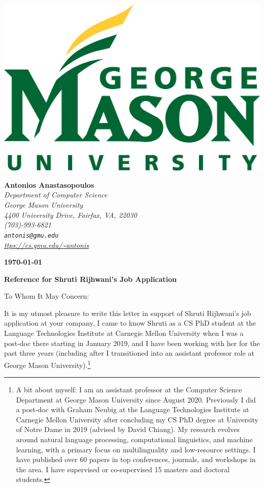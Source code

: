 \documentclass[10pt]{letter}
\begin{document}
\includegraphics[scale=1]{gmu.png}
\vspace{-3cm}

\begin{flushright}
\textbf{Antonios Anastasopoulos}\\
\textit{Department of Computer Science\\
George Mason University\\
4400 University Drive, Fairfax, VA, 22030\\
(703)-993-6821\\
\texttt{antonis@gmu.edu}\\
\url{ttps://cs.gmu.edu/~antonis}
}

\textbf{\today}
\end{flushright}
\vspace{0.2cm}

\textbf{Reference for Shruti Rijhwani's Job Application}

To Whom It May Concern:

It is my utmost pleasure to write this letter in support of Shruti Rijhwani's job application at your company.
I came to know Shruti as a CS PhD student at the Language Technologies Institute at Carnegie Mellon University when I was a post-doc there starting in January 2019, and I have been working with her for the past three years (including after I transitioned into an assistant professor role at George Mason University).\footnote{A bit about myself: I am an assistant professor at the Computer Science Department at George Mason University since August 2020. Previously I  did a post-doc with Graham Neubig at the Language Technologies Institute at Carnegie Mellon University after concluding my CS PhD degree at University of Notre Dame in 2019 (advised by David Chiang). My research evolves around natural language processing, computational linguistics, and machine learning, with a primary focus on multilinguality and low-resource settings. I have published over 60 papers in top conferences, journals, and workshops in the area. I have supervised or co-supervised 15 masters and doctoral students.}
\end{document}
